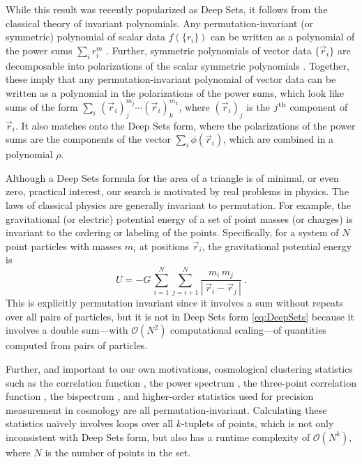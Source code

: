 \documentclass[10pt]{article}
\newcommand{\abs}[1]{|\,{#1}\,|}
\begin{document}
While this result was recently popularized as Deep Sets, it follows from the classical theory of invariant polynomials.
Any permutation-invariant (or symmetric) polynomial of scalar data $f(\{r_i\})$ can be written as a polynomial of the power sums $\sum_i r_i^m$ \citep{Waring1782}.
Further, symmetric polynomials of vector data $\{ \vec{r}_i \}$ are decomposable into polarizations of the scalar symmetric polynomials \citep{Weyl1939}.
Together, these imply that any permutation-invariant polynomial of vector data can be written as a polynomial in the polarizations of the power sums, which look like sums of the form $\sum_i \, (\vec{r}_{i})_{j}^{m_j} \cdots (\vec{r}_{i})_{k}^{m_k}$, where $(\vec{r}_i)_j$ is the $j^{\rm th}$ component of $\vec{r}_i$.
It also matches onto the Deep Sets form, where the polarizations of the power sums are the components of the vector $\sum_i \phi(\vec{r}_i)$, which are combined in a polynomial $\rho$.

Although a Deep Sets formula for the area of a triangle is of minimal, or even zero, practical interest, our search is motivated by real problems in physics.
The laws of classical physics are generally invariant to permutation.
For example, the gravitational (or electric) potential energy of a set of point masses (or charges) is invariant to the ordering or labeling of the points. 
Specifically, for a system of $N$ point particles with masses $m_i$ at positions $\vec{r}_i$, the gravitational potential energy is
\begin{equation}
\label{eq:EnergyNaive}
    U = -G \, \sum_{i=1}^{N} \sum_{j=i+1}^{N} \frac{m_i \, m_j}{\abs{\vec{r}_i - \vec{r}_j}} ~.
\end{equation}
This is explicitly permutation invariant since it involves a sum without repeats over all pairs of particles, but it is not in Deep Sets form \eqref{eq:DeepSets} because it involves a double sum---with $\mathcal{O}(N^2)$ computational scaling---of quantities computed from pairs of particles.

Further, and important to our own motivations, cosmological clustering statistics such as 
the correlation function \citep{Peebles1973},
the power spectrum \citep{Peebles1973},
the three-point correlation function \citep{PeeblesGroth1975},
the bispectrum \citep{FrySeldner1982},
and higher-order statistics \citep{Peebles1980book}
used for precision measurement in cosmology \citep[e.g.,][]{Eisenstein+2005BAO,Planck18PNG,Planck18Inflation,Cabass+2022}
are all permutation-invariant.
Calculating these statistics na\"ively involves loops over all $k$-tuplets of points, which is not only inconsistent with Deep Sets form, but also has a runtime complexity of $\mathcal{O}(N^k)$, where $N$ is the number of points in the set.
\end{document}
